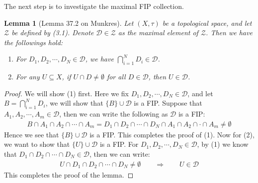 \documentclass[11pt]{book}
\theoremstyle{break}
\theoremstyle{break}
\newtheorem{lem}{Lemma}[thm]
\begin{document}
The next step is to investigate the maximal FIP collection. 
\begin{lem}[Lemma 37.2 on Munkres]
Let $(X,\tau)$ be a topological space, and let $\mathcal{Z}$ be defined by (3.1). Denote $\mathcal{D} \in \mathcal{Z}$ as the maximal element of $\mathcal{Z}$. Then we have the followings hold:
\begin{enumerate}[topsep=3pt,itemsep=-1ex,partopsep=1ex,parsep=1ex]
\item For $D_1,D_2,\cdots, D_N \in \mathcal{D}$, we have $\bigcap_{i=1}^N D_i \in \mathcal{D}$.
\item For any $U \subseteq X$, if $U\cap D \neq \emptyset$ for all $D \in \mathcal{D}$, then $U \in \mathcal{D}$.
\end{enumerate}
\end{lem}
\begin{proof}
We will show (1) first. Here we fix $D_1,D_2,\cdots, D_N \in \mathcal{D}$, and let $B = \bigcap_{i=1}^ND_i$, we will show that $\{B\} \cup \mathcal{D}$ is a FIP. Suppose that $A_1,A_2,\cdots, A_m \in \mathcal{D}$, then we can write the following as $\mathcal{D}$ is a FIP:
\begin{align*}
B\cap A_1 \cap A_2 \cap \cdots \cap A_m = D_1 \cap D_2 \cap \cdots \cap D_N \cap A_1 \cap A_2 \cap \cdot \cap A_m \neq \emptyset
\end{align*}
Hence we see that $\{B\}\cup \mathcal{D}$ is a FIP. This completes the proof of (1). Now for (2), we want to show that $\{U \} \cup \mathcal{D}$ is a FIP. For $D_1,D_2,\cdots, D_N \in \mathcal{D}$, by (1) we know that $D_1\cap D_2\cap \cdots \cap D_N \in \mathcal{D}$, then we can write:
\begin{align*}
U \cap D_1 \cap D_2 \cap \cdots \cap D_N \neq \emptyset \qquad \Rightarrow \qquad U \in \mathcal{D}
\end{align*}
This completes the proof of the lemma. 
\end{proof}
\end{document}
